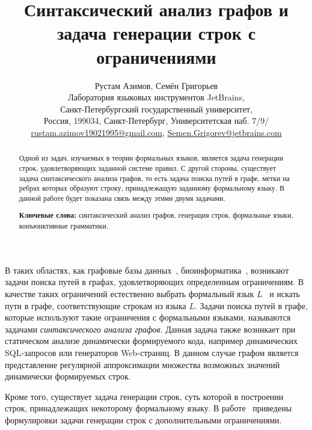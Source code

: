 \documentclass [10pt] {article}
\begin{document}
\title{Синтаксический анализ графов и задача генерации строк с ограничениями}
\author{Рустам Азимов, Семён Григорьев \\ 
Лаборатория языковых инструментов JetBrains, \\
Санкт-Петербургский государственный университет, \\
Россия, 199034, Санкт-Петербург, Университетская наб. 7/9/ \\ 
\url {rustam.azimov19021995@gmail.com}, \url {Semen.Grigorev@jetbrains.com}
}

\maketitle

\begin{abstract}
Одной из задач, изучаемых в теории формальных языков, является задача генерации строк, удовлетворяющих заданной системе правил. С другой стороны, существует задача синтаксического анализа графов, то есть задача поиска путей в графе, метки на ребрах которых образуют строку, принадлежащую заданному формальному языку. В данной работе будет показана связь между этими двумя задачами.

\vspace{1em}
\textbf{Ключевые слова:} синтаксический анализ графов, генерация строк, формальные языки, конъюнктивные грамматики.

\end{abstract}

В таких областях, как графовые базы данных~\cite{azimov-spbu-graphDB, azimov-spbu-zhang}, биоинформатика~\cite{azimov-spbu-Anderson}, возникают задачи поиска путей в графах, удовлетворяющих определенным ограничениям. В качестве таких ограничений естественно выбрать формальный язык $L$~\cite{azimov-spbu-barrett} и искать пути в графе, соответствующие строкам из языка $L$. Задачи поиска путей в графе, которые используют такие ограничения с формальными языками, называются задачами \textit{синтаксического анализа графов}. Данная задача также возникает при статическом анализе динамически формируемого кода, например динамических SQL-запросов или генераторов Web-страниц. В данном случае графом является представление регулярной аппроксимации множества возможных значений динамически формируемых строк.

Кроме того, существует задача генерации строк, суть которой в построении строк, принадлежащих некоторому формальному языку. В работе~\cite{azimov-spbu-Okhotin} приведены формулировки задачи генерации строк с дополнительными ограничениями.
\end{document}
